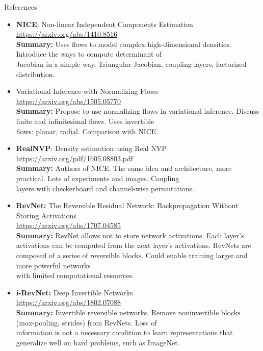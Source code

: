 \documentclass{beamer}
\begin{document}
\begin{frame}{References}
	{\tiny
		\begin{itemize}
			
			\item \textbf{NICE}: Non-linear Independent Components Estimation \\
			\href{https://arxiv.org/abs/1410.8516}{https://arxiv.org/abs/1410.8516} \\
			\textbf{Summary:} Uses flows to model complex high-dimensional densities. Introduce the ways to compute determinant of \\ Jacobian
			 in a simple way. Triangular Jacobian, coupling layers, factorized distribution.
			
			\item Variational Inference with Normalizing Flows \\
			\href{https://arxiv.org/abs/1505.05770}{https://arxiv.org/abs/1505.05770} \\
			\textbf{Summary:} Propose to use normalizing flows in variational inference. Discuss finite and infinitesimal flows. Uses invertible \\
			flows: planar, radial. Comparison with NICE.
			
			\item \textbf{RealNVP}: Density estimation using Real NVP \\
			\href{https://arxiv.org/pdf/1605.08803.pdf}{https://arxiv.org/pdf/1605.08803.pdf} \\
			\textbf{Summary:} Authors of NICE. The same idea and architecture, more practical. Lots of experiments and images. Coupling\\ layers with checkerboard and channel-wise permutations.
			
			\item \textbf{RevNet:} The Reversible Residual Network: Backpropagation Without Storing Activations \\
			\href{https://arxiv.org/abs/1707.04585}{https://arxiv.org/abs/1707.04585} \\
			\textbf{Summary:} RevNet allows not to store network activations. Each layer’s activations can be computed from the next layer’s activations. RevNets are composed of a series of reversible blocks. Could enable training larger and more powerful networks \\
			with limited computational resources. 
			
			\item \textbf{i-RevNet:} Deep Invertible Networks \\
			\href{https://arxiv.org/abs/1802.07088}{https://arxiv.org/abs/1802.07088} \\
			\textbf{Summary:} Invertible reversible networks. Remove noninvertible blocks (max-pooling, strides) from RevNets. Loss of \\
			information is not a necessary condition to learn representations that generalize well on hard problems, such as ImageNet.
			
		\end{itemize}
	}
\end{frame}
\end{document}
